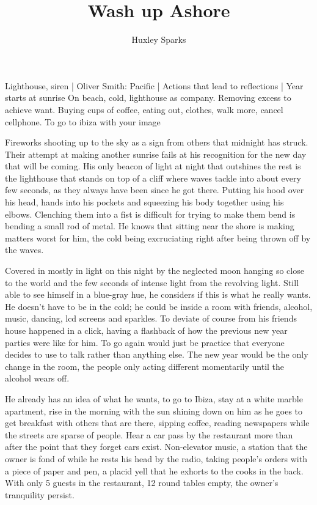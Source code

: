 \title{Wash up Ashore}
\author{Huxley Sparks}
\begin{Outline}
    Lighthouse, siren | Oliver Smith: Pacific | Actions that lead to reflections | Year starts at sunrise
            On beach, cold, lighthouse as company. Removing excess to achieve want. Buying cups of coffee,
        eating out, clothes, walk more, cancel cellphone. To go to ibiza with your image
\end{Outline}
\begin{Document}
        Fireworks shooting up to the sky as a sign from others that midnight has struck. Their attempt at making another sunrise fails at his recognition for
    the new day that will be coming. His only beacon of light at night that outshines the rest is the lighthouse that stands on top of a cliff where waves
    tackle into about every few seconds, as they always have been since he got there. Putting his hood over his head, hands into his pockets and squeezing his
    body together using his elbows. Clenching them into a fist is difficult for trying to make them bend is bending a small rod of metal. He knows that sitting
    near the shore is making matters worst for him, the cold being excruciating right after being thrown off by the waves.

        Covered in mostly in light on this night by the neglected moon hanging so close to the world and the few seconds of intense light from the revolving
    light. Still able to see himself in a blue-gray hue, he considers if this is what he really wants. He doesn't have to be in the cold; he could be inside
    a room with friends, alcohol, music, dancing, lcd screens and sparkles. To deviate of course from his friends house happened in a click, having a flashback
    of how the previous new year parties were like for him. To go again would just be practice that everyone decides to use to talk rather than anything else.
    The new year would be the only change in the room, the people only acting different momentarily until the alcohol wears off.

        He already has an idea of what he wants, to go to Ibiza, stay at a white marble apartment, rise in the morning with the sun shining down on him as he
    goes to get breakfast with others that are there, sipping coffee, reading newspapers while the streets are sparse of people. Hear a car pass by the 
    restaurant more than after the point that they forget cars exist. Non-elevator music, a station that the owner is fond of while he rests his head by the radio,
    taking people's orders with a piece of paper and pen, a placid yell that he exhorts to the cooks in the back. With only 5 guests in the restaurant, 12 round
    tables empty, the owner's tranquility persist.


\end{Document}
